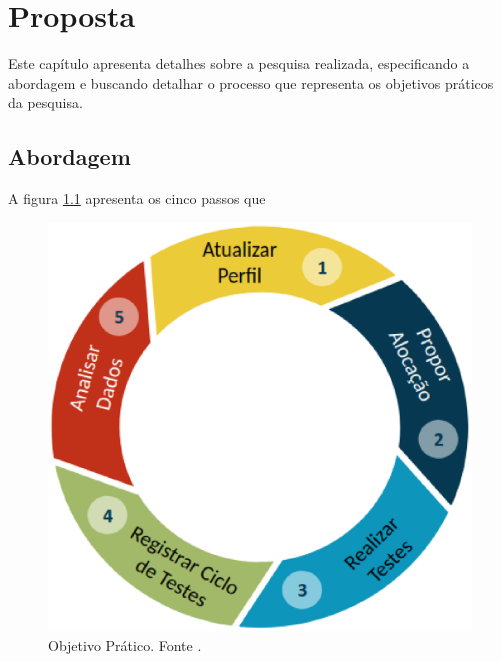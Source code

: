 \chapter[Proposta]{Proposta}
Este capítulo apresenta detalhes sobre a pesquisa realizada, especificando a abordagem e buscando detalhar o processo
que representa os objetivos práticos da pesquisa.

\section{Abordagem}

		A figura \ref{img:processo} apresenta os cinco passos que

\begin{figure}[H]
  \centering
  \includegraphics[scale=0.6]{figuras/processoCiclico.eps}
  \caption[Processo Cíclico]{Objetivo Prático. Fonte \cite{vieira}.}
  \label{img:processo}
\end{figure}
